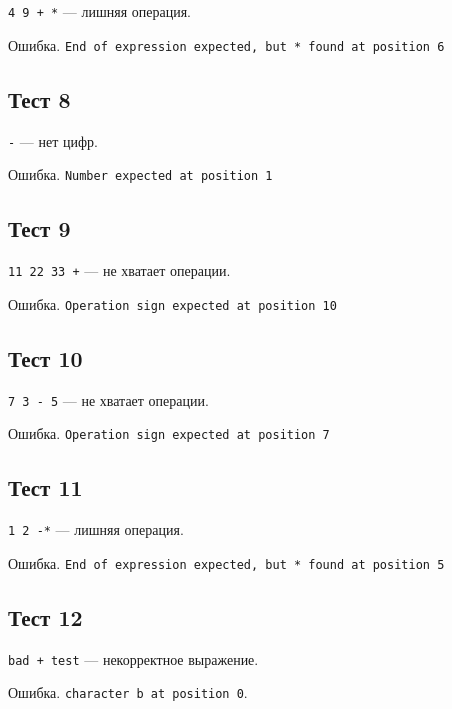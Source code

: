 \texttt{4 9 + *} --- лишняя операция.

Ошибка. \texttt{End of expression expected, but * found at position 6}

\subsection{Тест 8}

\texttt{-} --- нет цифр.

Ошибка. \texttt{Number expected at position 1}

\subsection{Тест 9}

\texttt{11 22 33 +} --- не хватает операции.

Ошибка. \texttt{Operation sign expected at position 10}

\subsection{Тест 10}

\texttt{7 3 - 5} --- не хватает операции.

Ошибка. \texttt{Operation sign expected at position 7}

\subsection{Тест 11}

\texttt{1 2 -*} --- лишняя операция.

Ошибка. \texttt{End of expression expected, but * found at position 5}

\subsection{Тест 12}

\texttt{bad + test} --- некорректное выражение.

Ошибка. \texttt{character b at position 0}.